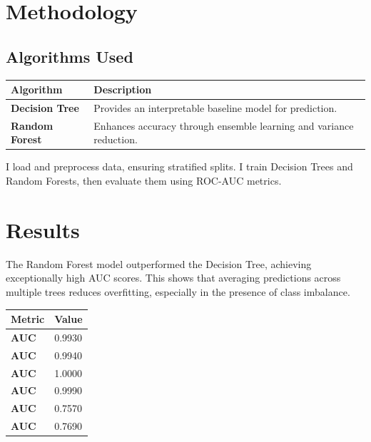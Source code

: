 \documentclass[11pt,a4paper]{article}
\begin{document}
\section{Methodology}

\subsection{Algorithms Used}

\begin{tabularx}{\linewidth}{@{}>{\bfseries}l X @{}}
  \arrayrulecolor{tableheader}
  \toprule
  \rowcolor{tableheader} Algorithm & Description \\
  \midrule
  \rowcolor{white} Decision Tree & Provides an interpretable baseline model for prediction. \\
  \rowcolor{tablerow} Random Forest & Enhances accuracy through ensemble learning and variance reduction. \\
  \bottomrule
\end{tabularx}

I load and preprocess data, ensuring stratified splits. I train Decision Trees and Random Forests, then evaluate them using ROC-AUC metrics.

\section{Results}

The Random Forest model outperformed the Decision Tree, achieving exceptionally high AUC scores. This shows that averaging predictions across multiple trees reduces overfitting, especially in the presence of class imbalance.

\vspace{4pt}

\begin{tabularx}{\linewidth}{@{}>{\bfseries}l X @{}}
  \arrayrulecolor{tableheader}
  \toprule
  \rowcolor{tableheader} Metric & Value \\
  \midrule
  \rowcolor{white} AUC & 0.9930 \\
  \rowcolor{tablerow} AUC & 0.9940 \\
  \rowcolor{white} AUC & 1.0000 \\
  \rowcolor{tablerow} AUC & 0.9990 \\
  \rowcolor{white} AUC & 0.7570 \\
  \rowcolor{tablerow} AUC & 0.7690 \\
  \bottomrule
\end{tabularx}
\end{document}
